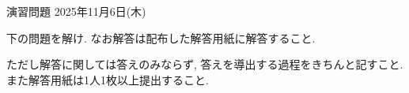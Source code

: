\documentclass[dvipdfmx,a4paper,12pt]{article} %
\theoremstyle{definition}
\theoremstyle{definition}
\theoremstyle{remark}
\numberwithin{equation}{section}
\begin{document}
\pagestyle{empty}



\begin{center}
{\Large 演習問題 2025年11月6日(木)} \\

\end{center}


\begin{center}
 {\large 下の問題を解け. なお解答は配布した解答用紙に解答すること.}
  \end{center}
 ただし解答に関しては答えのみならず, 答えを導出する過程をきちんと記すこと. 
 また解答用紙は1人1枚以上提出すること.
  
  \vspace{11pt}
 
\end{document}

